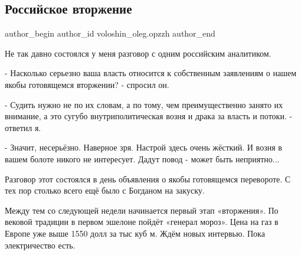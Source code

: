  
 
 
 
 
 
\subsection{Российское вторжение}
\label{sec:15_12_2021.fb.voloshin_oleg.opzzh.1.vtorzhenie_rossia}
 
\ifcmt
 author_begin
   author_id voloshin_oleg.opzzh
 author_end
\fi

Не так давно состоялся у меня разговор с одним российским аналитиком.

- Насколько серьезно ваша власть относится к собственным заявлениям о нашем
якобы готовящемся вторжении? - спросил он.


- Судить нужно не по их словам, а по тому, чем преимущественно занято их
внимание, а это сугубо внутриполитическая возня и драка за власть и потоки. -
ответил я.

- Значит, несерьёзно. Наверное зря. Настрой здесь очень жёсткий. И возня в
вашем болоте никого не интересует. Дадут повод - может быть неприятно...

Разговор этот состоялся в день объявления о якобы готовящемся перевороте. С тех
пор столько всего ещё было с Богданом на закуску. 

Между тем со следующей недели начинается первый этап «вторжения». По вековой
традиции в первом эшелоне пойдёт «генерал мороз». Цена на газ в Европе уже выше
1550 долл за тыс куб м. Ждём новых интервью. Пока электричество есть.

